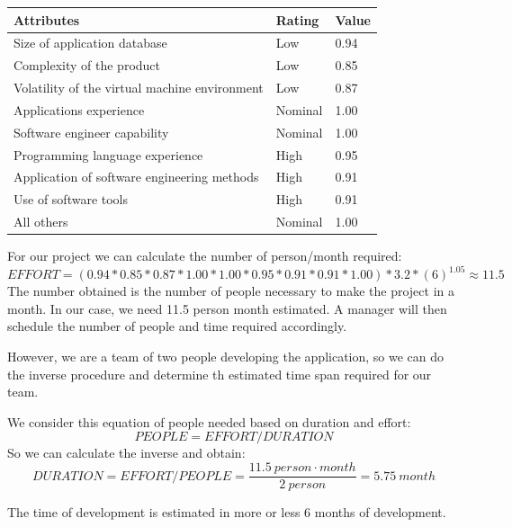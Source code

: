 \documentclass[a4paper]{scrreprt}
\begin{document}
\bigskip
\noindent
\begin{tabularx}{\linewidth}{|X|l|l|}
	\hline
	\textbf{Attributes} & \textbf{Rating} & \textbf{Value} \\ \hline
	Size of application database & Low & 0.94 \\ \hline
	Complexity of the product & Low & 0.85 \\ \hline
	Volatility of the virtual machine environment & Low & 0.87 \\ \hline
	Applications experience & Nominal & 1.00 \\ \hline
	Software engineer capability & Nominal & 1.00 \\ \hline
	Programming language experience & High & 0.95 \\ \hline
	Application of software engineering methods & High & 0.91 \\ \hline
	Use of software tools & High & 0.91 \\ \hline
	All others & Nominal & 1.00 \\ \hline
\end{tabularx}

\bigskip\noindent For our project we can calculate the number of person/month required:
\[ EFFORT = (0.94*0.85*0.87*1.00*1.00*0.95*0.91*0.91*1.00)*3.2*(6)^{1.05} \approx 11.5 \]
The number obtained is the number of people necessary to make the project in a month. In our case, we need 11.5 person month estimated. A manager will then schedule the number of people and time required accordingly.

However, we are a team of two people developing the application, so we can do the inverse procedure and determine th estimated time span required for our team.

We consider this equation of people needed based on duration and effort:
\[PEOPLE = EFFORT / DURATION\]
So we can calculate the inverse and obtain:
\[DURATION = EFFORT / PEOPLE = \frac{11.5\ person\cdot month}{2\ person} = 5.75\ month\]

The time of development is estimated in more or less 6 months of development.

%
%
\end{document}
